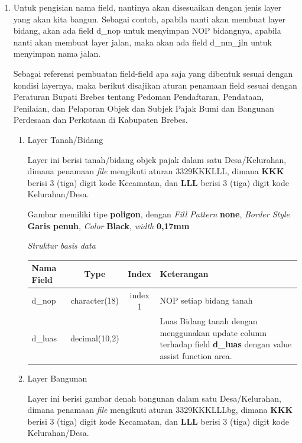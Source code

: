 \begin{enumerate}[\bfseries A.]
\begin{enumerate}[1.]
    \item Untuk pengisian nama field, nantinya akan disesuaikan dengan jenis layer yang akan kita bangun. Sebagai contoh, apabila nanti akan membuat layer bidang, akan ada field d\_nop untuk menyimpan NOP bidangnya, apabila nanti akan membuat layer jalan, maka akan ada field d\_nm\_jln untuk menyimpan nama jalan.
    
    Sebagai referensi pembuatan field-field apa saja yang dibentuk sesuai dengan kondisi layernya, maka berikut disajikan aturan penamaan field sesuai dengan Peraturan Bupati Brebes tentang Pedoman Pendaftaran, Pendataan, Penilaian, dan Pelaporan Objek dan Subjek Pajak Bumi dan Bangunan Perdesaan dan Perkotaan di Kabupaten Brebes.
    
    \begin{enumerate}[1.]
    
      \item Layer Tanah/Bidang
      
        Layer ini berisi tanah/bidang objek pajak dalam satu Desa/Kelurahan, dimana penamaan \textit{file} mengikuti aturan 3329KKKLLL, dimana \textbf{KKK} berisi 3 (tiga) digit kode Kecamatan, dan \textbf{LLL} berisi 3 (tiga) digit kode Kelurahan/Desa.
      
        Gambar memiliki tipe \textbf{poligon}, dengan \textit{Fill Pattern} \textbf{none}, \textit{Border Style} \textbf{Garis penuh}, \textit{Color} \textbf{Black}, \textit{width} \textbf{0,17mm}
        
        \textit{Struktur basis data}
      
        \begin{tabular}{| l | c | c | p{5cm} |}
          \hline
          Nama Field & Type & Index & Keterangan \\
          \hline
          d\_nop & character(18) & index 1 & NOP setiap bidang tanah \\
          \hline
          d\_luas & decimal(10,2) & & Luas Bidang tanah dengan menggunakan update  column terhadap field \textbf{d\_luas} dengan value assist function area. \\
          \hline          
        \end{tabular}
        
      \item Layer Bangunan
      
        Layer ini berisi gambar denah bangunan dalam satu Desa/Kelurahan, dimana penamaan \textit{file} mengikuti aturan 3329KKKLLLbg, dimana \textbf{KKK} berisi 3 (tiga) digit kode Kecamatan, dan \textbf{LLL} berisi 3 (tiga) digit kode Kelurahan/Desa.
      

\end{enumerate}
\end{enumerate}
\end{enumerate}
